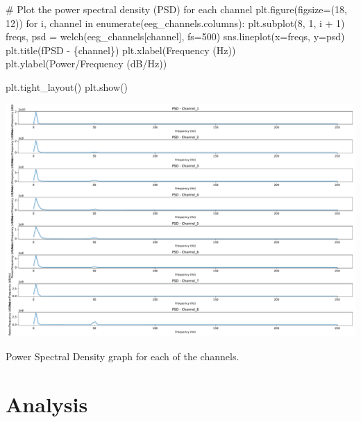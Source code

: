 \documentclass[
  11pt,
  letterpaper,
  DIV=11,
  numbers=noendperiod]{scrreprt}
\newenvironment{Shaded}{\begin{snugshade}}{\end{snugshade}}
\newcommand{\BuiltInTok}[1]{\textcolor[rgb]{0.00,0.23,0.31}{#1}}
\newcommand{\CommentTok}[1]{\textcolor[rgb]{0.37,0.37,0.37}{#1}}
\newcommand{\ControlFlowTok}[1]{\textcolor[rgb]{0.00,0.23,0.31}{#1}}
\newcommand{\DecValTok}[1]{\textcolor[rgb]{0.68,0.00,0.00}{#1}}
\newcommand{\KeywordTok}[1]{\textcolor[rgb]{0.00,0.23,0.31}{#1}}
\newcommand{\NormalTok}[1]{\textcolor[rgb]{0.00,0.23,0.31}{#1}}
\newcommand{\OperatorTok}[1]{\textcolor[rgb]{0.37,0.37,0.37}{#1}}
\newcommand{\SpecialCharTok}[1]{\textcolor[rgb]{0.37,0.37,0.37}{#1}}
\newcommand{\SpecialStringTok}[1]{\textcolor[rgb]{0.13,0.47,0.30}{#1}}
\newcommand{\StringTok}[1]{\textcolor[rgb]{0.13,0.47,0.30}{#1}}
\begin{document}
\begin{Shaded}
\begin{Highlighting}[]
\CommentTok{\# Plot the power spectral density (PSD) for each channel}
\NormalTok{plt.figure(figsize}\OperatorTok{=}\NormalTok{(}\DecValTok{18}\NormalTok{, }\DecValTok{12}\NormalTok{))}
\ControlFlowTok{for}\NormalTok{ i, channel }\KeywordTok{in} \BuiltInTok{enumerate}\NormalTok{(eeg\_channels.columns):}
\NormalTok{    plt.subplot(}\DecValTok{8}\NormalTok{, }\DecValTok{1}\NormalTok{, i }\OperatorTok{+} \DecValTok{1}\NormalTok{)}
\NormalTok{    freqs, psd }\OperatorTok{=}\NormalTok{ welch(eeg\_channels[channel], fs}\OperatorTok{=}\DecValTok{500}\NormalTok{)}
\NormalTok{    sns.lineplot(x}\OperatorTok{=}\NormalTok{freqs, y}\OperatorTok{=}\NormalTok{psd)}
\NormalTok{    plt.title(}\SpecialStringTok{f\textquotesingle{}PSD {-} }\SpecialCharTok{\{}\NormalTok{channel}\SpecialCharTok{\}}\SpecialStringTok{\textquotesingle{}}\NormalTok{)}
\NormalTok{    plt.xlabel(}\StringTok{\textquotesingle{}Frequency (Hz)\textquotesingle{}}\NormalTok{)}
\NormalTok{    plt.ylabel(}\StringTok{\textquotesingle{}Power/Frequency (dB/Hz)\textquotesingle{}}\NormalTok{)}

\NormalTok{plt.tight\_layout()}
\NormalTok{plt.show()}
\end{Highlighting}
\end{Shaded}

\includegraphics{eeg_files/figure-pdf/unnamed-chunk-3-3.pdf}

Power Spectral Density graph for each of the channels.

\section{Analysis}\label{analysis-3}
\end{document}
